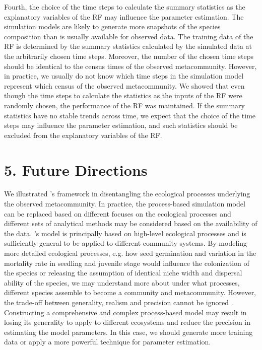 	Fourth, the choice of the time steps to calculate the summary statistics as the explanatory variables of the RF may influence the parameter estimation. The simulation models are likely to generate more snapshots of the species composition than is usually available for observed data. The training data of the RF is determined by the summary statistics calculated by the simulated data at the arbitrarily chosen time steps. Moreover, the number of the chosen time steps should be identical to the census times of the observed metacommunity. However, in practice, we usually do not know which time steps in the simulation model represent which census of the observed metacommunity. We showed that even though the time steps to calculate the statistics as the inputs of the RF were randomly chosen, the performance of the RF was maintained. If the summary statistics have no stable trends across time, we expect that the choice of the time steps may influence the parameter estimation, and such statistics should be excluded from the explanatory variables of the RF.
	
\chapter*{5. Future Directions}
\setcounter{chapter}{5}
	\noindent
	We illustrated \citeauthor{guzman2022accounting}'s framework in disentangling the ecological processes underlying the observed metacommunity. In practice, the process-based simulation model can be replaced based on different focuses on the ecological processes and different sets of analytical methods may be considered based on the availability of the data. \citeauthor{thompson2020process}'s model is principally based on high-level ecological processes and is sufficiently general to be applied to different community systems. By modeling more detailed ecological processes, e.g. how seed germination and variation in the mortality rate in seedling and juvenile stage would influence the colonization of the species or releasing the assumption of identical niche width and dispersal ability of the species, we may understand more about under what processes, different species assemble to become a community and metacommunity. However, the trade-off between generality, realism and precision cannot be ignored \citep{levins1966strategy}. Constructing a comprehensive and complex process-based model may result in losing its generality to apply to different ecosystems and reduce the precision in estimating the model parameters. In this case, we should generate more training data or apply a more powerful technique for parameter estimation.	
	
